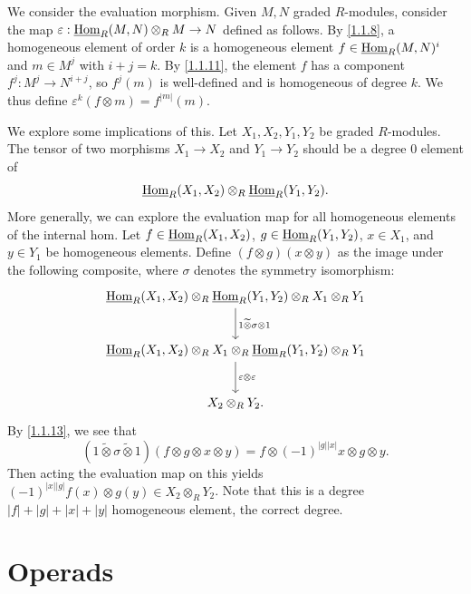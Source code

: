 \begin{discussion}\label{1.1.14}
	We consider the evaluation morphism. Given $M,N$ graded $R$-modules, consider the map $\varepsilon : \underline{\operatorname{Hom}}_R(M,N)\otimes_R M \to N$ defined as follows. By \cref{1.1.8}, a homogeneous element of order $k$ is a homogeneous element $f\in \underline{\operatorname{Hom}}_R(M,N)^i$ and $m\in M^j$ with $i+j=k$. By \cref{1.1.11}, the element $f$ has a component $f^j : M^j \to N^{i+j} $, so $f^j(m)$ is well-defined and is homogeneous of degree $k$. We thus define $\varepsilon^k(f\otimes m)=f^{\left| m \right| } (m)$.

	We explore some implications of this. Let $X_1,X_2,Y_1,Y_2$ be graded $R$-modules. The tensor of two morphisms $X_1\to X_2$ and $Y_1\to Y_2$ should be a degree 0 element of
	\[
		\underline{\operatorname{Hom}}_R (X_1,X_2)\otimes_R \underline{\operatorname{Hom}} _R(Y_1,Y_2)
	.\]
	More generally, we can explore the evaluation map for all homogeneous elements of the internal hom. Let $f\in \underline{\operatorname{Hom}} _R(X_1,X_2)$, $g\in \underline{\operatorname{Hom}} _R(Y_1,Y_2)$, $x\in X_1$, and $y\in Y_1$ be homogeneous elements. Define $(f\otimes g)(x\otimes y)$ as the image under the following composite, where $\sigma $ denotes the symmetry isomorphism:
	\[\begin{tikzcd}[row sep = 2.5em, column sep = 2.5em]
	\underline{\Hom} _R(X_1,X_2)\otimes _R \underline{\Hom}_R(Y_1,Y_2)\otimes _RX_1\otimes _RY_1\ar[" 1 \widetilde{\otimes } \sigma \otimes 1 ", d]  \\
	\underline{\Hom}_R(X_1,X_2)\otimes _RX_1\otimes _R\underline{\Hom} _R(Y_1,Y_2)\otimes _RY_1\ar[" \varepsilon \otimes  \varepsilon  ", d]   \\
	X_2\otimes _RY_2.
	\end{tikzcd}\]
	By \cref{1.1.13}, we see that
	\[
		(1 \widetilde{\otimes } \sigma \widetilde{\otimes } 1)(f\otimes g\otimes x\otimes y) = f \otimes (-1)^{\left| g \right| \left| x \right| } x \otimes g \otimes y
	.\]
	Then acting the evaluation map on this yields $(-1)^{\left| x \right| \left| g \right| } f(x)\otimes g(y)\in X_2 \otimes _RY_2$. Note that this is a degree $\left| f \right| +\left| g \right| +\left| x \right| +\left| y \right| $ homogeneous element, the correct degree.
\end{discussion}




\section{Operads}\label{sec:1.2}

